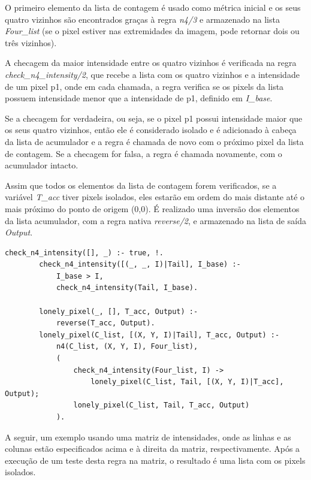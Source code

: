 \documentclass{article}
\begin{document}
        O primeiro elemento da lista de contagem é usado como métrica inicial e os seus quatro vizinhos são encontrados graças à regra \textit{n4/3} e armazenado na lista \textit{Four\_list} (se o pixel estiver nas extremidades da imagem, pode retornar dois ou três vizinhos).
        
        A checagem da maior intensidade entre os quatro vizinhos é verificada na regra \textit{check\_n4\_intensity/2}, que recebe a lista com os quatro vizinhos e a intensidade de um pixel p1, onde em cada chamada, a regra verifica se os pixels da lista possuem intensidade menor que a intensidade de p1, definido em \textit{I\_base}.
        
        Se a checagem for verdadeira, ou seja, se o pixel p1 possui intensidade maior que os seus quatro vizinhos, então ele é considerado isolado e é adicionado à cabeça da lista de acumulador e a regra é chamada de novo com o próximo pixel da lista de contagem. Se a checagem for falsa, a regra é chamada novamente, com o acumulador intacto.

        Assim que todos os elementos da lista de contagem forem verificados, se a variável \textit{T\_acc} tiver pixels isolados, eles estarão em ordem do mais distante até o mais próximo do ponto de origem (0,0). É realizado uma inversão dos elementos da lista acumulador, com a regra nativa \textit{reverse/2}, e armazenado na lista de saída \textit{Output}.

        \begin{lstlisting}[frame=single]
        check_n4_intensity([], _) :- true, !.
        check_n4_intensity([(_, _, I)|Tail], I_base) :-
            I_base > I,
            check_n4_intensity(Tail, I_base).

        lonely_pixel(_, [], T_acc, Output) :-
            reverse(T_acc, Output).
        lonely_pixel(C_list, [(X, Y, I)|Tail], T_acc, Output) :-
            n4(C_list, (X, Y, I), Four_list),
            (
                check_n4_intensity(Four_list, I) ->
                    lonely_pixel(C_list, Tail, [(X, Y, I)|T_acc], Output);
                lonely_pixel(C_list, Tail, T_acc, Output)
            ).
        \end{lstlisting}

        A seguir, um exemplo usando uma matriz de intensidades, onde as linhas e as colunas estão especificados acima e à direita da matriz, respectivamente. Após a execução de um teste desta regra na matriz, o resultado é uma lista com os pixels isolados.
\end{document}
